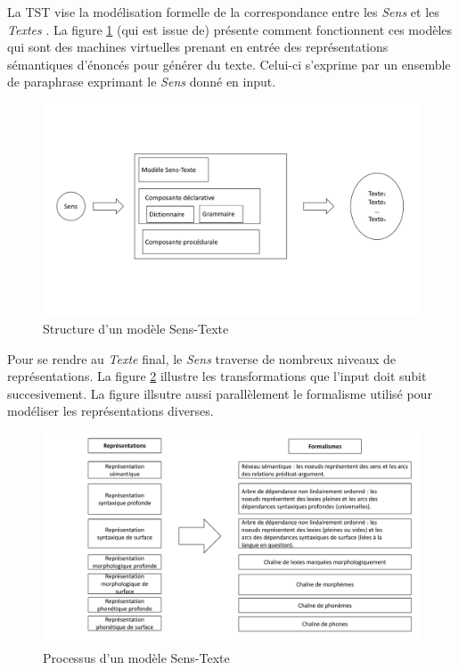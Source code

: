 La \ac{TST} vise la modélisation formelle de la correspondance entre les \emph{Sens} et les \emph{Textes} \citep{PolgueretheorieSensTexte1998, MelcukVerslinguistiqueSensTexte1997, DBLP:conf/coling/JolkovskyM67}. La figure \ref{fig:modeletst} (qui est issue de\cite{PolgueretheorieSensTexte1998}) présente comment fonctionnent ces modèles qui sont des machines virtuelles prenant en entrée des représentations sémantiques d'énoncés pour générer du texte. Celui-ci s'exprime par un ensemble de paraphrase exprimant le \emph{Sens} donné en input.

\begin{figure}[htb]
	\centering
	\includegraphics[width=1\textwidth, trim = {0cm 4cm 0cm 4cm},clip]{ch3/figs/polguere1.pdf}
	\caption{Structure d'un modèle Sens-Texte \citep{PolgueretheorieSensTexte1998}}
	\label{fig:modeletst}
\end{figure}

Pour se rendre au \emph{Texte} final, le \emph{Sens} traverse de nombreux niveaux de représentations. La figure \ref{fig:processustst} illustre les transformations que l'input doit subit succesivement. La figure illsutre aussi parallèlement le formalisme utilisé pour modéliser les représentations diverses.

\begin{figure}[htb]
	\centering
	\includegraphics[width=1\textwidth, trim = {0cm 0cm 0cm 0cm},clip]{ch3/figs/polguere2.pdf}
	\caption{Processus d'un modèle Sens-Texte \citep{PolgueretheorieSensTexte1998}}
	\label{fig:processustst}
\end{figure}

